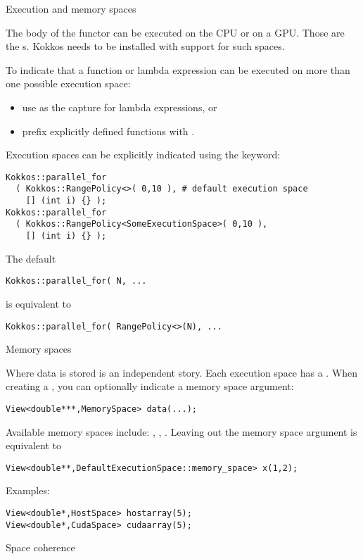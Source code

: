  {Execution and memory spaces}

The body of the functor can be executed on the CPU or on a GPU.
Those are the s.
Kokkos needs to be installed with support for such spaces.

To indicate that a function or lambda expression can be executed
on more than one possible execution space:
\begin{itemize}
\item use  as the capture for lambda expressions, or
\item prefix explicitly defined functions with .
\end{itemize}
Execution spaces can be explicitly indicated using the 
keyword:
\begin{lstlisting}
Kokkos::parallel_for
  ( Kokkos::RangePolicy<>( 0,10 ), # default execution space
    [] (int i) {} );
Kokkos::parallel_for
  ( Kokkos::RangePolicy<SomeExecutionSpace>( 0,10 ), 
    [] (int i) {} );
\end{lstlisting}
The default
\begin{lstlisting}
Kokkos::parallel_for( N, ...
\end{lstlisting}
is equivalent to 
\begin{lstlisting}
Kokkos::parallel_for( RangePolicy<>(N), ...
\end{lstlisting}

 {Memory spaces}

Where data is stored is an independent story.
Each execution space has a .
When creating a ,
you can optionally indicate a memory space argument:
\begin{lstlisting}
View<double***,MemorySpace> data(...);
\end{lstlisting}
Available memory spaces include:
, , .
Leaving out the memory space argument is equivalent to
\begin{lstlisting}
View<double**,DefaultExecutionSpace::memory_space> x(1,2);
\end{lstlisting}

Examples:
\begin{lstlisting}
View<double*,HostSpace> hostarray(5);
View<double*,CudaSpace> cudaarray(5);
\end{lstlisting}

 {Space coherence}

